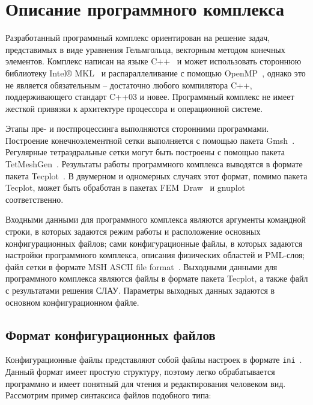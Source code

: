 \documentclass[a4paper,14pt]{article}
\makeatletter
\newcommand{\labelname}[1]{%
	\def\@currentlabelname{#1}}%
\newcommand{\CodeFont}[1]{{\small{\texttt{#1}}}}
\makeatother
\begin{document}

\clearpage
\section{Описание программного комплекса}
\labelname{4}\label{sec:program_description}
Разработанный программный комплекс ориентирован на решение задач, представимых в виде уравнения Гельмгольца, векторным методом конечных элементов. Комплекс написан на языке C++~\citep{cpp_2003} и может использовать стороннюю библиотеку Intel® MKL~\citep{intel_mkl} и распараллеливание с помощью OpenMP~\citep{openmp}, однако это не является обязательным -- достаточно любого компилятора C++, поддерживающего стандарт C++03 и новее. Программный комплекс не имеет жесткой привязки к архитектуре процессора и операционной системе.

Этапы пре- и постпроцессинга выполняются сторонними программами. Построение конечноэлементной сетки выполняется с помощью пакета Gmsh~\citep{gmsh_article}. Регулярные тетраэдральные сетки могут быть построены с помощью пакета TetMeshGen~\citep{tet_mesh_gen}. Результаты работы программного комплекса выводятся в формате пакета Tecplot~\citep{tecplot}. В двумерном и одномерных случаях этот формат, помимо пакета Tecplot, может быть обработан в пакетах FEM~Draw~\citep{fem_draw} и gnuplot~\citep{gnuplot} соответственно.

Входными данными для программного комплекса являются аргументы командной строки, в которых задаются режим работы и расположение основных конфигурационных файлов; сами конфигурационные файлы, в которых задаются настройки программного комплекса, описания физических областей и PML-слоя; файл сетки в формате MSH ASCII file format~\citep{gmsh_doc}. Выходными данными для программного комплекса являются файлы в формате пакета Tecplot, а также файл с результатами решения СЛАУ. Параметры выходных данных задаются в основном конфигурационном файле.

\subsection{Формат конфигурационных файлов}
Конфигурационные файлы представляют собой файлы настроек в формате \CodeFont{ini}~\citep{ini_format}. Данный формат имеет простую структуру, поэтому легко обрабатывается программно и имеет понятный для чтения и редактирования человеком вид. Рассмотрим пример синтаксиса файлов подобного типа:
\end{document}
